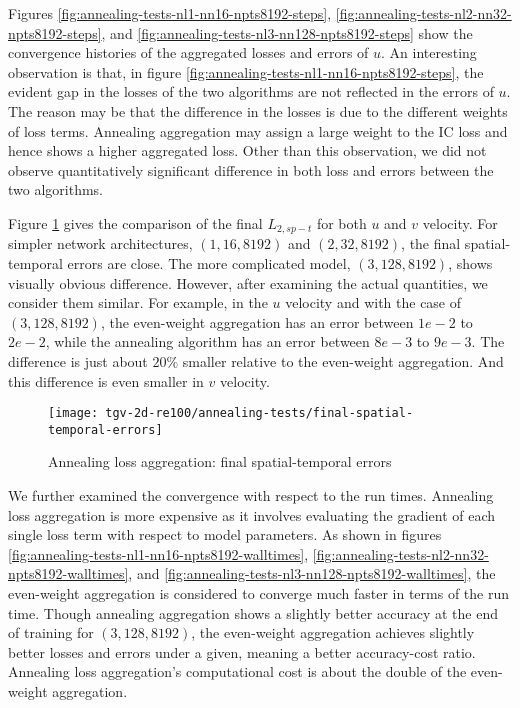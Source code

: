 Figures \ref{fig:annealing-tests-nl1-nn16-npts8192-steps}, \ref{fig:annealing-tests-nl2-nn32-npts8192-steps}, and \ref{fig:annealing-tests-nl3-nn128-npts8192-steps} show the convergence histories of the aggregated losses and errors of $u$.
An interesting observation is that, in figure \ref{fig:annealing-tests-nl1-nn16-npts8192-steps}, the evident gap in the losses of the two algorithms are not reflected in the errors of $u$.
The reason may be that the difference in the losses is due to the different weights of loss terms.
Annealing aggregation may assign a large weight to the IC loss and hence shows a higher aggregated loss.
Other than this observation, we did not observe quantitatively significant difference in both loss and errors between the two algorithms.

Figure \ref{fig:annealing-tests-final-sterrs} gives the comparison of the final $L_{2,sp-t}$ for both $u$ and $v$ velocity.
For simpler network architectures, $(1, 16, 8192)$ and $(2, 32, 8192)$, the final spatial-temporal errors are close.
The more complicated model, $(3, 128, 8192)$, shows visually obvious difference.
However, after examining the actual quantities, we consider them similar.
For example, in the $u$ velocity and with the case of $(3, 128, 8192)$, the even-weight aggregation has an error between $1e-2$ to $2e-2$, while the annealing algorithm has an error between $8e-3$ to $9e-3$.
The difference is just about $20\%$ smaller relative to the even-weight aggregation.
And this difference is even smaller in $v$ velocity.

\begin{figure}[hbt!]
    \centering%
    \texttt{[image: tgv-2d-re100/annealing-tests/final-spatial-temporal-errors]}%
    \caption[%
        Annealing loss aggregation: final spatial-temporal errors%
    ]{%
        Annealing loss aggregation: final spatial-temporal errors%
    }\label{fig:annealing-tests-final-sterrs}%
\end{figure}

We further examined the convergence with respect to the run times.
Annealing loss aggregation is more expensive as it involves evaluating the gradient of each single loss term with respect to model parameters.
As shown in figures \ref{fig:annealing-tests-nl1-nn16-npts8192-walltimes}, \ref{fig:annealing-tests-nl2-nn32-npts8192-walltimes}, and \ref{fig:annealing-tests-nl3-nn128-npts8192-walltimes}, the even-weight aggregation is considered to converge much faster in terms of the run time.
Though annealing aggregation shows a slightly better accuracy at the end of training for $(3, 128, 8192)$, the even-weight aggregation achieves slightly better losses and errors under a given, meaning a better accuracy-cost ratio.
Annealing loss aggregation's computational cost is about the double of the even-weight aggregation. 

